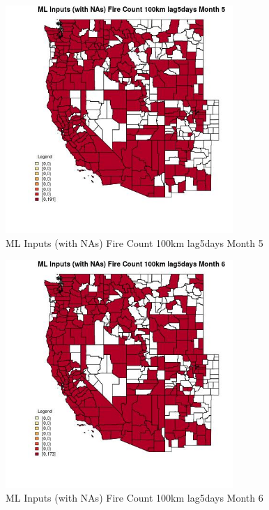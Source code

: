 \begin{figure} 
\centering  
\includegraphics[width=0.77\textwidth]{Code_Outputs/Report_ML_input_PM25_Step4_part_e_de_duplicated_aves_compiled_2019-05-21wNAs_CountyFire_Count_100km_lag5daysmedianMonth5.jpg} 
\caption{\label{fig:Report_ML_input_PM25_Step4_part_e_de_duplicated_aves_compiled_2019-05-21wNAsCountyFire_Count_100km_lag5daysmedianMonth5}ML Inputs (with NAs) Fire Count 100km lag5days Month 5} 
\end{figure} 
 

\begin{figure} 
\centering  
\includegraphics[width=0.77\textwidth]{Code_Outputs/Report_ML_input_PM25_Step4_part_e_de_duplicated_aves_compiled_2019-05-21wNAs_CountyFire_Count_100km_lag5daysmedianMonth6.jpg} 
\caption{\label{fig:Report_ML_input_PM25_Step4_part_e_de_duplicated_aves_compiled_2019-05-21wNAsCountyFire_Count_100km_lag5daysmedianMonth6}ML Inputs (with NAs) Fire Count 100km lag5days Month 6} 
\end{figure} 
 

